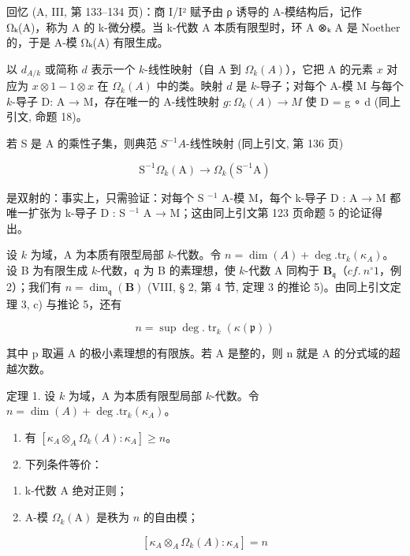 回忆 (A, III, 第 133–134 页)：商 I/I² 赋予由 ρ 诱导的 A-模结构后，记作 Ωₖ(A)，称为 A 的 k-微分模。当 k-代数 A 本质有限型时，环 A ⊗ₖ A 是 Noether 的，于是 A-模 Ωₖ(A) 有限生成。

以 \(d_{A/k}\) 或简称 \(d\) 表示一个 \(k\)-线性映射（自 A 到 \(\Omega_k(A)\)），它把 A 的元素 \(x\) 对应为 \(x \otimes 1 - 1 \otimes x\) 在 \(\Omega_k(A)\) 中的类。映射 \(d\) 是 \(k\)-导子；对每个 A-模 M 与每个 \(k\)-导子 D: A → M，存在唯一的 A-线性映射 \(g: \Omega_k(A) \to M\) 使 D = g ∘ d (同上引文, 命题 18)。

若 S 是 A 的乘性子集，则典范 \(S^{-1}A\)-线性映射 (同上引文, 第 136 页)

\[
\mathrm{S} ^ {- 1} \Omega_ {k} (\mathrm{A}) \rightarrow \Omega_ {k} (\mathrm{S} ^ {- 1} \mathrm{A})
\]

是双射的：事实上，只需验证：对每个 S \(^{-1}\) A-模 M，每个 k-导子 D : A → M 都唯一扩张为 k-导子 D : S \(^{-1}\) A → M；这由同上引文第 123 页命题 5 的论证得出。

设 \(k\) 为域，A 为本质有限型局部 \(k\)-代数。令 \(n = \dim(A) + \deg.\mathrm{tr}_k(\kappa_A)\)。设 B 为有限生成 \(k\)-代数，\(\mathfrak{q}\) 为 B 的素理想，使 \(k\)-代数 A 同构于 \(\mathbf{B}_{\mathfrak{q}}\)（\(cf.\ n^{\circ} 1\)，例 2）；我们有 \(n = \dim_{\mathfrak{q}}(\mathbf{B})\) (VIII, § 2, 第 4 节, 定理 3 的推论 5)。由同上引文定理 3, c) 与推论 5，还有

\[
n = \sup \deg . \operatorname{tr} _ {k} (\kappa (\mathfrak {p}))
\]

其中 p 取遍 A 的极小素理想的有限族。若 A 是整的，则 n 就是 A 的分式域的超越次数。

定理 1. 设 \(k\) 为域，A 为本质有限型局部 \(k\)-代数。令 \(n = \dim(A) + \deg.\mathrm{tr}_{k}(\kappa_{A})\)。

\begin{enumerate}
\def\labelenumi{\alph{enumi})}
\item
  有 \([\kappa_{A} \otimes_{A} \Omega_k(A): \kappa_{A}] \geqslant n\)。
\item
  下列条件等价：
\end{enumerate}

\begin{enumerate}
\def\labelenumi{(\roman{enumi})}
\item
  k-代数 A 绝对正则；
\item
  A-模 \(\Omega_{k}(\mathrm{A})\) 是秩为 \(n\) 的自由模；
\end{enumerate}

\[
\left[ \kappa_ {A} \otimes_ {A} \Omega_ {k} (A): \kappa_ {A} \right] = n
\]

